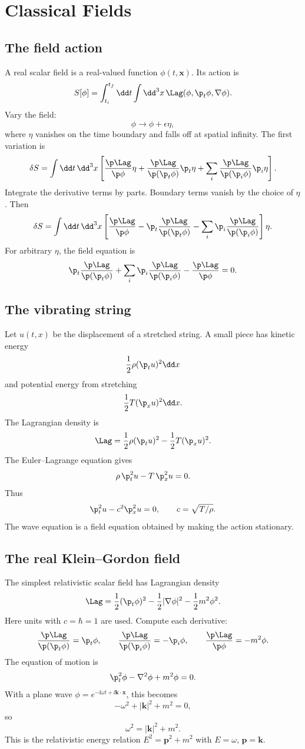 \chapter{Classical Fields}

\section{The field action}

A real scalar field is a real-valued function \(\phi(t,\bm x)\).  Its action is
\[
  S[\phi]=\int_{t_i}^{t_f}\dd t\int\dd^3x\,
  \Lag(\phi,\p_t\phi,\nabla\phi).
\]
Vary the field:
\[
  \phi\to\phi+\epsilon\eta,
\]
where \(\eta\) vanishes on the time boundary and falls off at spatial infinity.  The first variation is
\[
  \delta S
  =
  \int\dd t\,\dd^3x
  \left[
  \frac{\p\Lag}{\p\phi}\eta
  +\frac{\p\Lag}{\p(\p_t\phi)}\p_t\eta
  +\sum_i
  \frac{\p\Lag}{\p(\p_i\phi)}\p_i\eta
  \right].
\]
Integrate the derivative terms by parts.  Boundary terms vanish by the choice of \(\eta\).  Then
\[
  \delta S
  =
  \int\dd t\,\dd^3x
  \left[
  \frac{\p\Lag}{\p\phi}
  -
  \p_t\frac{\p\Lag}{\p(\p_t\phi)}
  -
  \sum_i\p_i\frac{\p\Lag}{\p(\p_i\phi)}
  \right]\eta.
\]
For arbitrary \(\eta\), the field equation is
\[
  \p_t\frac{\p\Lag}{\p(\p_t\phi)}
  +
  \sum_i\p_i\frac{\p\Lag}{\p(\p_i\phi)}
  -
  \frac{\p\Lag}{\p\phi}=0.
\]

\section{The vibrating string}

Let \(u(t,x)\) be the displacement of a stretched string.  A small piece has kinetic energy
\[
  \frac12\rho(\p_tu)^2\dd x
\]
and potential energy from stretching
\[
  \frac12T(\p_xu)^2\dd x.
\]
The Lagrangian density is
\[
  \Lag=\frac12\rho(\p_tu)^2-\frac12T(\p_xu)^2.
\]
The Euler--Lagrange equation gives
\[
  \rho\,\p_t^2u-T\,\p_x^2u=0.
\]
Thus
\[
  \p_t^2u-c^2\p_x^2u=0,\qquad c=\sqrt{T/\rho}.
\]
The wave equation is a field equation obtained by making the action stationary.

\section{The real Klein--Gordon field}

The simplest relativistic scalar field has Lagrangian density
\[
  \Lag=
  \frac12(\p_t\phi)^2
  -\frac12|\nabla\phi|^2
  -\frac12m^2\phi^2.
\]
Here units with \(c=\hbar=1\) are used.  Compute each derivative:
\[
  \frac{\p\Lag}{\p(\p_t\phi)}=\p_t\phi,
  \qquad
  \frac{\p\Lag}{\p(\p_i\phi)}=-\p_i\phi,
  \qquad
  \frac{\p\Lag}{\p\phi}=-m^2\phi.
\]
The equation of motion is
\[
  \p_t^2\phi-\nabla^2\phi+m^2\phi=0.
\]
With a plane wave \(\phi=e^{-\ii\omega t+\ii\bm k\cdot\bm x}\), this becomes
\[
  -\omega^2+|\bm k|^2+m^2=0,
\]
so
\[
  \omega^2=|\bm k|^2+m^2.
\]
This is the relativistic energy relation \(E^2=\bm p^2+m^2\) with \(E=\omega\), \(\bm p=\bm k\).

